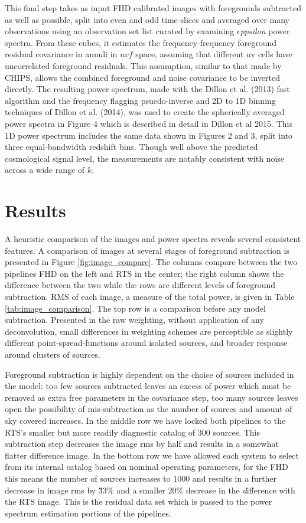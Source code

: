 \documentclass[preprint]{aastex}
\def\eppsilon{{\it $\epsilon$ppsilon }}
\def\dilloncite{Dillon et al 2015}
\begin{document}
This final step takes as input FHD calibrated images with foregrounds subtracted as well as possible, split into even and odd time-slices and averaged over many observations using an observation set list curated by examining \eppsilon power spectra. From these cubes, it estimates the frequency-frequency foreground residual covariance in annuli in $uvf$ space, assuming that different uv cells have uncorrelated foreground residuals. This assumption, similar to that made by CHIPS, allows the combined foreground and noise covariance to be inverted directly. The resulting power spectrum, made with the Dillon et al. (2013) fast algorithm and the frequency flagging psuedo-inverse and 2D to 1D binning techniques of Dillon et al. (2014), was used to create the spherically averaged power spectra in Figure 4 which is described in detail in \dilloncite. This 1D power spectrum includes the same data shown in Figures 2 and 3, split into three equal-bandwidth redshift bins. Though well above the predicted cosmological signal level, the measurements are notably consistent with noise across a wide range of $k$. 


\section{Results}
\label{sec:results}
A heuristic comparison of the images and power spectra reveals several consistent features. A comparison of images at several stages of foreground subtraction is presented in Figure \ref{fig:image_compare}. The columns compare between the two pipelines FHD on the left and RTS in the center; the right column shows the difference between the two while the rows are different levels of foreground subtraction. RMS of  each image, a measure of the total power, is given in Table \ref{tab:image_comparison}.  The top row is a comparison before any model subtraction. Presented in the raw weighting, without application of any deconvolution, small differences in weighting schemes are perceptible as slightly different point-spread-functions around isolated sources, and broader response around clusters of sources.  

Foreground subtraction is highly dependent on the choice of sources included in the model: too few sources subtracted leaves an excess of power which must be removed as extra free parameters in the covariance step, too many sources leaves open the possibility of mis-subtraction as the number of sources and amount of sky covered increases. In the middle row we have locked both pipelines to the RTS's smaller but more readily diagnostic catalog of 300 sources.  This subtraction step decreases the image rms by half and results in a somewhat flatter difference image.  In the bottom row we have allowed each system to select from its internal catalog based on nominal operating parameters, for the FHD this means the number of sources increases to 1000 and results in a further decrease in image rms by \~33\% and a smaller 20\% decrease in the {\emph difference} with the RTS image.   This is the residual data set which is passed to the power spectrum estimation portions of the pipelines.
\end{document}
